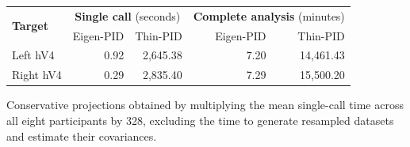 \begin{threeparttable}
\begin{tabular}{lrrrr}
\toprule
\multirow{2}{*}{\textbf{Target}} & \multicolumn{2}{c}{\textbf{Single call} (seconds)} & \multicolumn{2}{c}{\textbf{Complete analysis} (minutes)} \\
 & Eigen-PID & Thin-PID & Eigen-PID & Thin-PID \\
\midrule
Left hV4 & 0.92 & 2,645.38 & 7.20 & 14,461.43{\tnote{\dag}} \\
Right hV4 & 0.29 & 2,835.40 & 7.29 & 15,500.20{\tnote{\dag}} \\
\bottomrule
\end{tabular}
\begin{tablenotes}[flushleft]
\footnotesize
\item[\dag] Conservative projections obtained by multiplying the mean single-call time across all eight participants by 328, excluding the time to generate resampled datasets and estimate their covariances.
\end{tablenotes}
\end{threeparttable}
